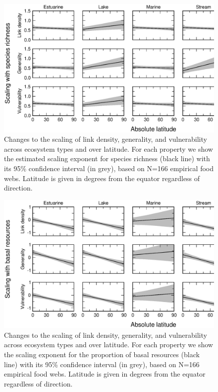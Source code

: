 \documentclass[12pt]{article}
\begin{document}
\begin{figure}[h]
\centerline{\includegraphics*[width=.8\textwidth]{Figures/by_TL/marginal/S_marginal_latitude_proportions.eps}}
\caption{Changes to the scaling of link density, generality, and vulnerability across ecosystem
types and over latitude. For each property we show the estimated scaling exponent for species richness (black
line) with its 95\% confidence interval (in grey),
based on N=166 empirical food webs. Latitude is 
given in degrees from the equator
regardless of direction.}
\label{S}
\end{figure}


\begin{figure}[!h]
\centerline{\includegraphics*[width=.8\textwidth]{Figures/by_TL/marginal/B_marginal_latitude_proportions.eps}}
\caption{Changes to the scaling of link density, generality, and vulnerability across ecosystem
types and over latitude. For each property we show the scaling exponent for the proportion of
basal resources (black line) with its 95\% confidence interval (in grey), based on N=166 
empirical food webs. Latitude is given in degrees
from the equator regardless of direction.}
\label{B}
\end{figure}

\newpage
\end{document}
